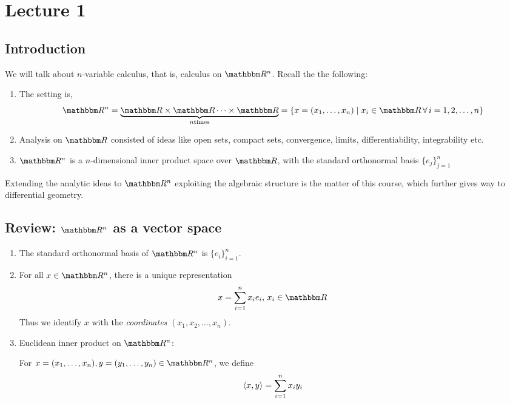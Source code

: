 \documentclass[../Analysis-3]{subfiles}
\begin{document}
\chapter*{Lecture 1} %
\setcounter{chapter}{1} %
\setcounter{section}{0}

\section{Introduction}
We will talk about $ n $-variable calculus, that is, calculus on $ \R^n $. Recall the the following:
\begin{enumerate}[label = $\bullet$]
      \item The setting is,
            \[ \R^n = \underbrace{\R \times \R \cdots \times \R}_{n \text{times}} = \{x = (x_1, \dots, x_n) \mid x_i \in \R \, \forall \, i = 1,2, \dots, n\} \]
      \item Analysis on $ \R $ consisted of ideas like open sets, compact sets, convergence, limits, differentiability, integrability etc.
      \item $ \R^n $ is a $ n $-dimensional inner product space over $ \R $, with the standard orthonormal basis $ \{e_j\}_{j=1}^n $
\end{enumerate}

Extending the analytic ideas to $ \R^n $ exploiting the algebraic structure is the matter of this course, which further gives way to differential geometry.

\section{Review: $ \R^n $ as a vector space}

\begin{enumerate}[label = (\roman*)]
      \item The standard orthonormal basis of $ \R^n $ is $ \{e_i\}_{i=1}^n $.
      \item For all $ x \in \R^n $, there is a unique representation
            \[ x = \sum_{i=1}^n x_i e_i, \, x_i \in \R \]
            Thus we identify $ x $ with the \textit{coordinates} $ (x_1,x_2, \dots, x_n) $.
      \item Euclidean inner product on $ \R^n $:

            For $ x = (x_1, \dots, x_n), y = (y_1, \dots, y_n) \in \R^n $, we define
            \[ \left\langle {x}, {y} \right\rangle = \sum_{i=1}^{n} x_iy_i \]
\end{enumerate}
\end{document}
